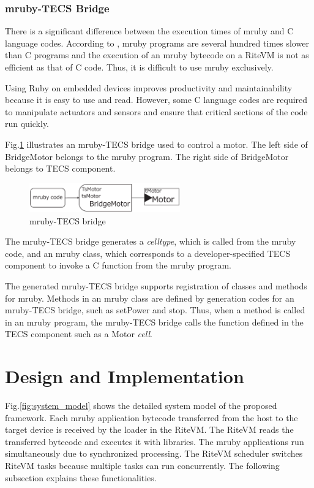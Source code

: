 \documentclass[S,R,E]{article/compsoft}
\begin{document}
\subsubsection{mruby-TECS Bridge}
There is a significant difference between the execution times of mruby and C language codes.
According to  \cite{par:mrubyonTECS}, mruby programs are several hundred times slower than C programs and the execution of an mruby bytecode on a RiteVM is not as efficient as that of C code.
Thus, it is difficult to use mruby exclusively.

Using Ruby on embedded devices improves productivity and maintainability because it is easy to use and read.
However, some C language codes are required to manipulate actuators and sensors and ensure that critical sections of the code run quickly.

Fig.\ref{fig:mruby_TECS_bridge} illustrates an mruby-TECS bridge used to control a motor.
The left side of BridgeMotor belongs to the mruby program.
The right side of BridgeMotor belongs to TECS component.
\begin{figure}[t]
    \centering
    \includegraphics[width=6.5cm,clip]{figure/mruby_TECS_bridge.eps}
\caption{mruby-TECS bridge}
\label{fig:mruby_TECS_bridge}
\end{figure}

The mruby-TECS bridge generates a {\it celltype}, which is called from the mruby code, and an mruby class, which corresponds to a developer-specified TECS component to invoke a C function from the mruby program.

The generated mruby-TECS bridge supports registration of classes and methods for mruby.
Methods in an mruby class are defined by generation codes for an mruby-TECS bridge, such as setPower and stop.
Thus, when a method is called in an mruby program, the mruby-TECS bridge calls the function defined in the TECS component such as a Motor {\it cell}.

\section{Design and Implementation}
\label{sec:Design and Implementation}
Fig.\ref{fig:system_model} shows the detailed system model of the proposed framework.
Each mruby application bytecode transferred from the host to the target device is received by the loader in the RiteVM.
The RiteVM reads the transferred bytecode and executes it with libraries.
The mruby applications run simultaneously due to synchronized processing.
The RiteVM scheduler switches RiteVM tasks because multiple tasks can run concurrently.
The following subsection explains these functionalities.
\end{document}
